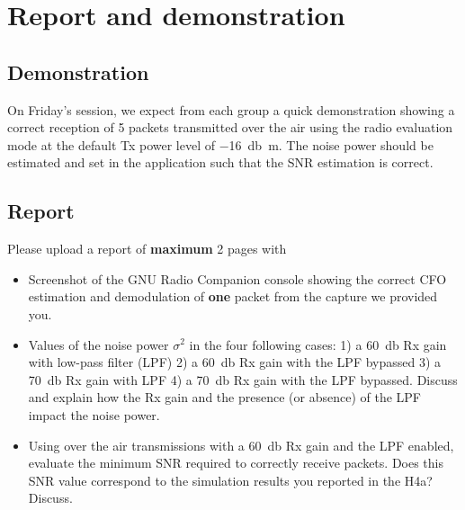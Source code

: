 \section{Report and demonstration}

\subsection{Demonstration}

On Friday's session, we expect from each group a quick demonstration showing a correct reception of 5 packets transmitted over the air using the radio evaluation mode
at the default Tx power level of \SI{-16}{\decibel\meter}. The noise power should be estimated and set in the application such that the SNR estimation is correct.

\subsection{Report}

Please upload a report of \textbf{maximum} 2 pages with
\begin{itemize}
    \item Screenshot of the GNU Radio Companion console showing the correct CFO estimation and demodulation of \textbf{one} packet from the capture we provided you.
    \item Values of the noise power $\sigma^2$ in the four following cases:
        1) a \SI{60}{\decibel} Rx gain with low-pass filter (LPF) 2) a \SI{60}{\decibel} Rx gain with the LPF bypassed 3) a \SI{70}{\decibel} Rx gain with LPF 4) a \SI{70}{\decibel} Rx gain with the LPF bypassed.
    Discuss and explain how the Rx gain and the presence (or absence) of the LPF impact the noise power.
\item Using over the air transmissions with a \SI{60}{\decibel} Rx gain and the LPF enabled, evaluate the minimum SNR required to correctly receive packets.
    Does this SNR value correspond to the simulation results you reported in the H4a? Discuss.
\end{itemize}
